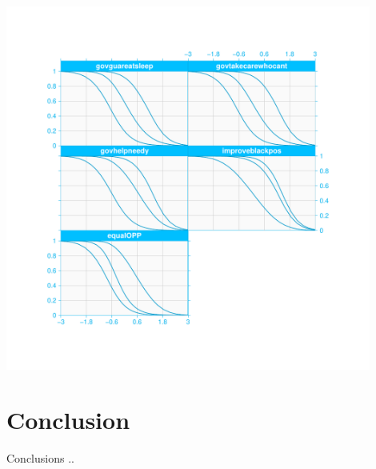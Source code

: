 \documentclass{amsart}
\begin{document}
\begin{center}
{\includegraphics[width=12cm]{./graph/plotGrd2blue.pdf}}
\end{center}


\section{Conclusion}
Conclusions ..


\end{document}
